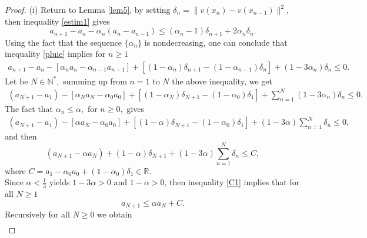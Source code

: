 \documentclass[10pt,a4paper]{amsart}
\begin{document}
\begin{proof}
	(i) Return to Lemma \ref{lem5}, by setting $\delta_n=\|v(x_n)-v(x_{n-1})\|^2$, then inequality \eqref{estim1} gives
	\begin{equation}\label{pluie}
	a_{n+1}-a_n-\alpha_n(a_n-a_{n-1})\leq (\alpha_n-1)\delta_{n+1}+2\alpha_n\delta_{n}.
	\end{equation}
	Using the fact that the sequence $\{\alpha_n\}$ is nondecreasing,  one can conclude that inequality \eqref{pluie} implies for $n\geq1$
	\begin{equation*}
	\begin{array}{l}
	a_{n+1}-a_n-\left[\alpha_n a_n- \alpha_{n-1}a_{n-1}\right]+\left[(1-\alpha_n)\delta_{n+1}-(1-\alpha_{n-1})\delta_{n}\right]+\left(1-3\alpha_n\right)\delta_n\leq 0.
	\end{array}
	\end{equation*}
	Let be $N\in \mathbb{N}^*,$ summing up  from $n=1$ to $N$  the above inequality, we get
	\begin{equation}\label{arg}
	\begin{array}{l}
	(a_{N+1}-a_1)- \left[\alpha_N a_N- \alpha_{0}a_{0}\right]+ \left[(1-\alpha_{N})\delta_{N+1}-(1-\alpha_{0})\delta_{1}\right]+\sum_{n=1}^N (1-3\alpha_n)\delta_n
	\leq 0.
	\end{array}
	\end{equation} 
	The fact that $\alpha_n\leq \alpha,$ for $n\geq 0,$  gives 
	\begin{equation}\label{soleil}
	\begin{array}{l}
	(a_{N+1}-a_1)- \left[\alpha a_N- \alpha_{0}a_{0}\right]+ \left[(1-\alpha)\delta_{N+1}-(1-\alpha_{0})\delta_{1}\right]+(1-3\alpha)\sum_{n=1}^N \delta_n
	\leq 0,
	\end{array}
	\end{equation} 
	and then
	\begin{equation}\label{C1}
	(a_{N+1}-\alpha a_N)+(1-\alpha)\delta_{N+1}+(1-3\alpha)\sum_{n=1}^N\delta_n\leq C
	,\end{equation}
	where $C=a_1-\alpha_0 a_0+(1-\alpha_0)\delta_1\in \mathbb{R}.$\\
	Since $\alpha <\frac{1}{3}$ yields $1-3\alpha>0$ and $1-\alpha>0$, then inequality \eqref{C1} implies that  for all $N\geq 1$
	\begin{equation}\label{C2}
	a_{N+1}\leq \alpha a_N+C. \end{equation}
	Recursively for all $
	N\geq  0$ we obtain 
	\begin{align*}

\end{align*}
\end{proof}
\end{document}
